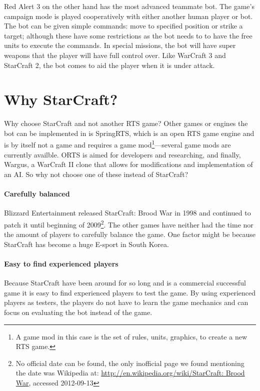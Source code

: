 Red Alert 3\cite{redalert3} on the other hand has the most advanced teammate bot. The game’s
campaign mode is played cooperatively with either another human player or bot. The bot can be given
simple commands: move to specified position or strike a target; although these have some
restrictions as the bot needs to to have the free units to execute the commands. In special
missions, the bot will have super weapons that the player will have full control over. Like WarCraft
3 and StarCraft 2, the bot comes to aid the player when it is under attack.

\section{Why StarCraft?} \label{sec:why_starcraft}	Why choose StarCraft and not another RTS game?
Other games or engines the bot can be implemented in is SpringRTS\cite{springrts}, which is an open RTS
game engine and is by itself not a game and requires a game mod\footnote{A game mod in this case is
the set of rules, units, graphics, to create a new RTS game.}—several game mods are currently availble.
ORTS\cite{orts} is aimed for developers and researching, and finally, Wargus\cite{wargus}, a
WarCraft II clone that allows for modifications and implementation of an AI. So why not choose one
of these instead of StarCraft?

\paragraph{Carefully balanced} Blizzard Entertainment released StarCraft: Brood War in 1998 and
continued to patch it until beginning of 2009\footnote{No official date can be found,
the only inofficial page we found mentioning the date was Wikipedia at:
\url{http://en.wikipedia.org/wiki/StarCraft: Brood War}, accessed 2012-09-13}. The other games have
neither had the time nor the amount of players to carefully balance the game. One factor might be
because StarCraft has become a huge E-sport in South Korea\cite{scKotakuKorea}.

\paragraph{Easy to find experienced players} Because StarCraft have been around for so long and is a
commercial successful game it is easy to find experienced players to test the game. By using
experienced players as testers, the players do not have to learn the game mechanics and can focus on
evaluating the bot instead of the game.

